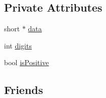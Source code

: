 \subsection*{Private Attributes}
\begin{DoxyCompactItemize}
\item 
short $\ast$ \hyperlink{class_big_int_af181978224e5a90c5dbd4cbcd3d80379}{data}
\item 
int \hyperlink{class_big_int_a19085d2456cc9b7b79b9ff15b63a2588}{digits}
\item 
bool \hyperlink{class_big_int_aff7539a3ecc2cbc8ab3117ed40f4352c}{is\+Positive}
\end{DoxyCompactItemize}
\subsection*{Friends}
